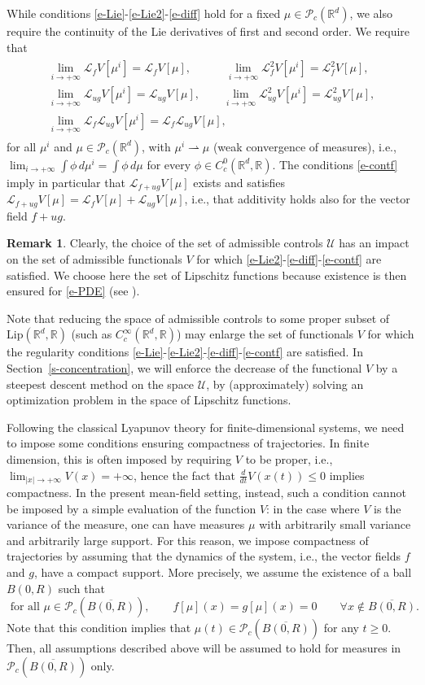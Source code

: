 \documentclass{article}
\newcommand{\R}{\mathbb{R}}
\renewcommand{\P}{\mathcal{P}_c(\R^d)}
\renewcommand{\L}{\mathcal{L}}
\newcommand{\PR}{\mathcal{P}_c(\overline{B(0,R)})}
\theoremstyle{definition}\newtheorem{remark}{Remark}
\newcommand{\brem}{\begin{remark}}
\newcommand{\erem}{\end{remark}}
\newcommand{\bqn}{\begin{eqnarray}}
\newcommand{\eqnl}[1]{\label{#1}\end{eqnarray}}
\newcommand{\ba}[1]{\begin{array}{#1}}
\newcommand{\ea}{\end{array}}
\newcommand{\Lip}{\mathrm{Lip}}
\renewcommand{\r}[1]{\eqref{#1}}
\newcommand{\weak}{\rightharpoonup}
\newcommand{\U}{\mathcal{U}}
\begin{document}
While conditions \r{e-Lie}-\r{e-Lie2}-\r{e-diff} hold for a fixed $\mu\in\P$, we also require the continuity of the Lie derivatives of first and second order. We require that
\bqn
\ba{l}
\displaystyle\lim_{i\to+\infty}\L_{f}V[\mu^i]=\L_{f}V[\mu],\qquad \quad
\displaystyle\lim_{i\to+\infty}\L_f^2V[\mu^i]=\L_f^2V[\mu],\\
\displaystyle \lim_{i\to+\infty}\L_{ug}V[\mu^i]=\L_{ug}V[\mu],\qquad
\displaystyle \lim_{i\to+\infty}\L_{ug}^2V[\mu^i]=\L_{ug}^2V[\mu],\\
\displaystyle \lim_{i\to+\infty}\L_{f}\L_{ug}V[\mu^i]=\L_{f}\L_{ug}V[\mu] ,
\ea
\eqnl{e-contf}
for all $\mu^i$ and $\mu\in\P$, with $\mu^i\weak \mu$ (weak convergence of measures), i.e., $\lim_{i\to+\infty}\int \phi \,d\mu^i=\int \phi\,d\mu$ for every $\phi\in C^0_c(\R^d,\R)$. The conditions \r{e-contf} imply in particular that $\L_{f+ug}V[\mu]$ exists and satisfies $\L_{f+ug}V[\mu]=\L_fV[\mu]+\L_{ug}V[\mu]$, i.e., that additivity holds also for the vector field $f+ug$.

\brem Clearly, the choice of the set of admissible controls $\U$ has an impact on the set of admissible functionals $V$ for which \r{e-Lie2}-\r{e-diff}-\r{e-contf} are satisfied. We choose here the set of Lipschitz functions because existence is then ensured for \r{e-PDE} (see \cite{ambrosio-gangbo,pedestrian}).

Note that reducing the space of admissible controls to some proper subset of $\Lip(\R^d,\R)$ (such as $C^\infty_c(\R^d,\R)$) may enlarge the set of functionals $V$ for which the regularity conditions \r{e-Lie}-\r{e-Lie2}-\r{e-diff}-\r{e-contf} are satisfied. In Section~\ref{s-concentration}, we will enforce the decrease of the functional $V$ by a steepest descent method on the space $\U$, by (approximately) solving an optimization problem in the space of Lipschitz functions.
\erem 

Following the classical Lyapunov theory for finite-dimensional systems, we need to impose some conditions ensuring compactness of trajectories. In finite dimension, this is often imposed by requiring $V$ to be proper, i.e., $\lim_{\vert x\vert\to+\infty}V(x)=+\infty$, hence the fact that $\frac{d}{dt} V(x(t))\leq 0$ implies compactness. In the present mean-field setting, instead, such a condition cannot be imposed by a simple evaluation of the function $V$: in the case where $V$ is the variance of the measure, one can have measures $\mu$ with arbitrarily small variance and arbitrarily large support.
For this reason, we impose compactness of trajectories by assuming that the dynamics of the system, i.e., the vector fields $f$ and $g$, have a compact support. More precisely, we assume the existence of a ball $B(0,R)$ such that %
\begin{equation}
\mbox{ for all } \mu \in \PR, \qquad  f[\mu](x)=g[\mu](x)=0\qquad\forall x\not\in\overline{B(0,R)}.\label{e-compact}
\end{equation}
Note that this condition implies that $\mu(t)\in\PR$ for any $t\geq 0$. Then, all assumptions described above will be assumed to hold for measures in $\PR$ only.
\end{document}
